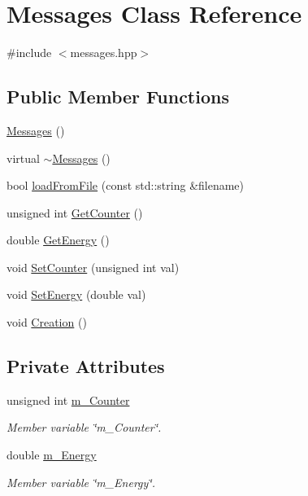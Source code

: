 \hypertarget{classMessages}{}\section{Messages Class Reference}
\label{classMessages}


{\ttfamily \#include $<$messages.\+hpp$>$}

\subsection*{Public Member Functions}
\begin{DoxyCompactItemize}
\item 
\mbox{\hyperlink{classMessages_abd3013dea54bfd87550739c3fa6e20d5}{Messages}} ()
\item 
virtual \mbox{\hyperlink{classMessages_ab0060ed5667e5dd2d47811df6c42d462}{$\sim$\+Messages}} ()
\item 
bool \mbox{\hyperlink{classMessages_a4263549c3f5c27b68279adbd7bcbcc30}{load\+From\+File}} (const std\+::string \&filename)
\item 
unsigned int \mbox{\hyperlink{classMessages_a256f8190d9ef6e25db6a5030f9805b5d}{Get\+Counter}} ()
\item 
double \mbox{\hyperlink{classMessages_ab33cb49f408b16cf1fa29b5f141921c4}{Get\+Energy}} ()
\item 
void \mbox{\hyperlink{classMessages_aecaad70bba58fd8d1a5640cb04088a2c}{Set\+Counter}} (unsigned int val)
\item 
void \mbox{\hyperlink{classMessages_a522996f78812e3a01e68214385db2cfd}{Set\+Energy}} (double val)
\item 
void \mbox{\hyperlink{classMessages_ac575287a8c19833d30480c5fb1769dfa}{Creation}} ()
\end{DoxyCompactItemize}
\subsection*{Private Attributes}
\begin{DoxyCompactItemize}
\item 
unsigned int \mbox{\hyperlink{classMessages_a43ed87c9f9c3ed6dee41b1e420eaf30f}{m\+\_\+\+Counter}}
\begin{DoxyCompactList}\small\item\em Member variable \char`\"{}m\+\_\+\+Counter\char`\"{}. \end{DoxyCompactList}\item 
double \mbox{\hyperlink{classMessages_afd1431daeff8d60f5856b36144b49f87}{m\+\_\+\+Energy}}
\begin{DoxyCompactList}\small\item\em Member variable \char`\"{}m\+\_\+\+Energy\char`\"{}. \end{DoxyCompactList}\end{DoxyCompactItemize}


